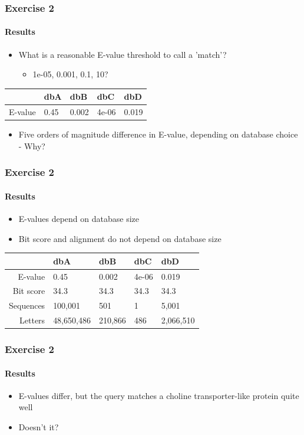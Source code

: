 \documentclass[table]{beamer}
\begin{document}
  \begin{frame}
    \frametitle{Exercise 2}
    \framesubtitle{Results}
    \begin{itemize}
      \item What is a reasonable E-value threshold to call a 'match'?
      \begin{itemize}
        \item 1e-05, 0.001, 0.1, 10?
      \end{itemize}
    \end{itemize}
    \begin{center}
	\begin{tabular}{r|l|l|l|l}
	   & dbA & dbB & dbC & dbD \\
	  \hline
	  \hline
	  E-value & 0.45 & 0.002 & 4e-06 & 0.019 \\
	\end{tabular}
    \end{center}
    \begin{itemize}
      \item Five orders of magnitude difference in E-value, depending on database choice - Why?
    \end{itemize}    
  \end{frame}

  \begin{frame}
    \frametitle{Exercise 2}
    \framesubtitle{Results}
    \begin{itemize}
      \item E-values depend on database size
      \item Bit score and alignment do not depend on database size
    \end{itemize}
    \begin{center}
	\begin{tabular}{r|l|l|l|l}
	   & dbA & dbB & dbC & dbD \\
	  \hline
	  \hline
	  E-value & 0.45 & 0.002 & 4e-06 & 0.019 \\
	  Bit score & 34.3 & 34.3 & 34.3 & 34.3 \\
	  \hline
	  Sequences & 100,001 & 501 & 1 & 5,001 \\
	  Letters & 48,650,486 & 210,866 & 486 & 2,066,510 	  
	\end{tabular}
    \end{center}
  \end{frame}

  \begin{frame}
    \frametitle{Exercise 2}
    \framesubtitle{Results}    
    \begin{itemize}
      \item<1-> E-values differ, but the query matches a choline transporter-like 
protein quite well
      \item<2-> Doesn't it?
    \end{itemize}
  \end{frame}
\end{document}
